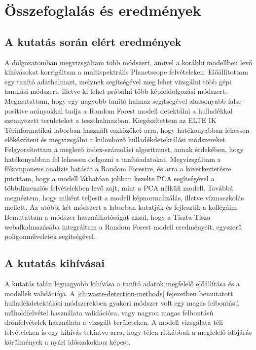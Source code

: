 \chapter{Összefoglalás és eredmények}
\label{ch:sum}

\section{A kutatás során elért eredmények}

A dolgozatomban megvizsgáltam több módszert, amivel a korábbi modellben levő kihívásokat korrigáltam a multispektrális Planetscope felvételeken. Előállítottam egy tanító adathalmazt, melynek segítségével meg lehet vizsgálni több gépi tanulási módszert, illetve ki lehet próbálni több képfeldolgozási módszert. Megmutattam, hogy egy nagyobb tanító halmaz segítségével alacsonyabb false-positive arányokkal tudja a Random Forest modell detektálni a hulladékkal szennyezett területeket a teszthalmazban. Kiegészítettem az ELTE IK Térinformatikai laborban használt eszközöket arra, hogy hatékonyabban lehessen előkészíteni és megvizsgálni a különböző hulladékdetektálási módszereket. Felgyorsítottam a meglevő index-számolási algoritmust, annak érdekében, hogy hatékonyabban fel lehessen dolgozni a tanítóadatokat. Megvizsgáltam a főkomponens analízis hatását a Random Forestre, és arra a következtetésre jutottam, hogy a modell láthatóan jobban kezelte PCA segítségével a többdimenziós felvételekben levő zajt, mint a PCA nélküli modell. Továbbá megnéztem, hogy miként teljesít a modell képnormalizálás, illetve vízmaszkolás mellett. Az utóbbi két módszert a laborban kutatják és fejlesztik a kollégáim. Bemutattam a módszer használhatóságát azzal, hogy a Tiszta-Tisza webalkalmazásába integráltam a Random Forest modell eredményeit, egyszerű poligonműveletek segítségével.

\section{A kutatás kihívásai}

A kutatás talán legnagyobb kihívása a tanító adatok megfelelő előállítása és a modellek validációja. A \ref{ch:waste-detection-methods} fejezetben bemutatott hulladékdetektálási módszerekben gyakori módszer volt egy magas felbontású műholdfelvétel használata validációra, vagy nagyon magas felbontású drónfelvételek használata a vizsgált területeken. A modell vizsgálata téli felvételeken is egy kihívás tekintve arra, hogy télen ritkábbak a megfelelő időjárás körülmények a nyári időszakokhoz képest. 

